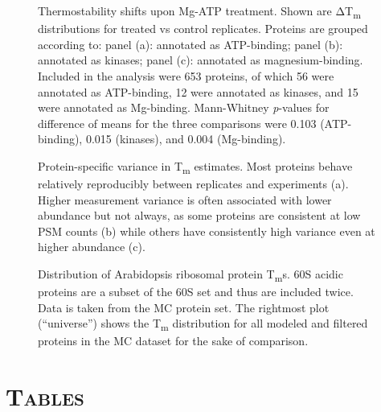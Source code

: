 \documentclass[11pt,letter]{article}\usepackage[]{graphicx}\usepackage[]{color}
\newcommand{\Tm}{T\textsubscript{m}}
\newcommand{\DeltaTm}{Δ\Tm}
\begin{document}

\begin{figure}\centering

\caption{Thermostability shifts upon Mg-ATP treatment. Shown are \DeltaTm{}
distributions for treated vs control replicates. Proteins are grouped
according to: panel (a): annotated as ATP-binding; panel (b): annotated as
kinases; panel (c): annotated as magnesium-binding. Included in the analysis
were 653 proteins, of which 56
were annotated as ATP-binding, 12 were annotated as
kinases, and 15 were annotated as Mg-binding.
Mann-Whitney \textit{p}-values for difference of means for the three
comparisons were 0.103 (ATP-binding), 0.015
(kinases), and 0.004 (Mg-binding).}

\label{fig:atp}
\end{figure}


\begin{figure}\centering

\caption{Protein-specific variance in \Tm{} estimates. Most proteins behave
relatively reproducibly between replicates and experiments (a). Higher
measurement variance is often associated with lower abundance but not always,
as some proteins are consistent at low PSM counts (b) while others have
consistently high variance even at higher abundance (c).}

\label{fig:se}
\end{figure}


\begin{figure}\centering

\caption{Distribution of Arabidopsis ribosomal protein \Tm{}s. 60S acidic
proteins are a subset of the 60S set and thus are included twice. Data is
taken from the MC protein set. The rightmost plot (``universe'') shows the
\Tm{} distribution for all modeled and filtered proteins in the MC dataset for
the sake of comparison.}

\label{fig:ribo_tms}
\end{figure}


\clearpage
\section*{\textsc{Tables}}
\end{document}
